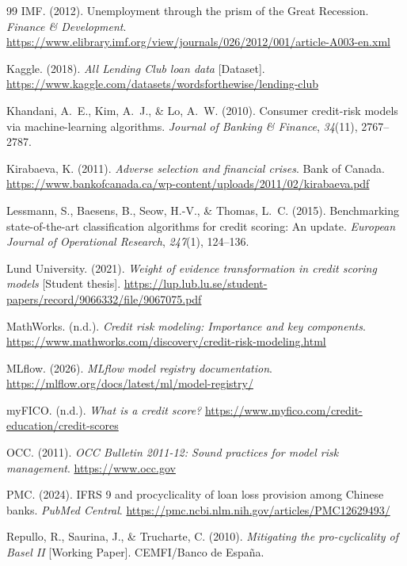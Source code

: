 \documentclass[12pt,a4paper]{report}
\begin{document}
\begin{thebibliography}{99}
IMF. (2012). Unemployment through the prism of the Great Recession. \textit{Finance \& Development}. \url{https://www.elibrary.imf.org/view/journals/026/2012/001/article-A003-en.xml}

Kaggle. (2018). \textit{All Lending Club loan data} [Dataset]. \url{https://www.kaggle.com/datasets/wordsforthewise/lending-club}

Khandani, A.~E., Kim, A.~J., \& Lo, A.~W. (2010). Consumer credit-risk models via machine-learning algorithms. \textit{Journal of Banking \& Finance}, \textit{34}(11), 2767--2787.

Kirabaeva, K. (2011). \textit{Adverse selection and financial crises}. Bank of Canada. \url{https://www.bankofcanada.ca/wp-content/uploads/2011/02/kirabaeva.pdf}

Lessmann, S., Baesens, B., Seow, H.-V., \& Thomas, L.~C. (2015). Benchmarking state-of-the-art classification algorithms for credit scoring: An update. \textit{European Journal of Operational Research}, \textit{247}(1), 124--136.

Lund University. (2021). \textit{Weight of evidence transformation in credit scoring models} [Student thesis]. \url{https://lup.lub.lu.se/student-papers/record/9066332/file/9067075.pdf}

MathWorks. (n.d.). \textit{Credit risk modeling: Importance and key components}. \url{https://www.mathworks.com/discovery/credit-risk-modeling.html}

MLflow. (2026). \textit{MLflow model registry documentation}. \url{https://mlflow.org/docs/latest/ml/model-registry/}

myFICO. (n.d.). \textit{What is a credit score?} \url{https://www.myfico.com/credit-education/credit-scores}

OCC. (2011). \textit{OCC Bulletin 2011-12: Sound practices for model risk management}. \url{https://www.occ.gov}

PMC. (2024). IFRS 9 and procyclicality of loan loss provision among Chinese banks. \textit{PubMed Central}. \url{https://pmc.ncbi.nlm.nih.gov/articles/PMC12629493/}

Repullo, R., Saurina, J., \& Trucharte, C. (2010). \textit{Mitigating the pro-cyclicality of Basel II} [Working Paper]. CEMFI/Banco de Espa\~{n}a.


\end{thebibliography}
\end{document}
